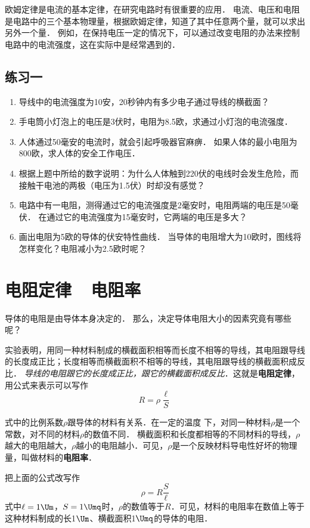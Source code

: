 欧姆定律是电流的基本定律，在研究电路时有很重要的应用．
电流、电压和电阻是电路中的三个基本物理量，根据欧姆定律，知道了其中任意两个量，就可以求出另外一个量．
例如，在保持电压一定的情况下，可以通过改变电阻的办法来控制电路中的电流强度，这在实际中是经常遇到的．


\subsection*{练习一}

\begin{enumerate}
    \item 导线中的电流强度为10安，20秒钟内有多少电子通过导线的横截面？
    \item 手电筒小灯泡上的电压是3伏时，电阻为8.5欧，求通过小灯泡的电流强度．
    \item 人体通过50毫安的电流时，就会引起呼吸器官麻痹．
    如果人体的最小电阻为800欧，求人体的安全工作电压．
    \item 根据上题中所给的数字说明：为什么人体触到220伏的电线时会发生危险，而接触干电池的两极（电压为1.5伏）时却没有感觉？
    \item 电路中有一电阻，测得通过它的电流强度是2毫安时，电阻两端的电压是50毫伏．
    在通过它的电流强度为15毫安时，它两端的电压是多大？
    \item 画出电阻为5欧的导体的伏安特性曲线．
    当导体的电阻增大为10欧时，图线将怎样变化？电阻减小为2.5欧时呢？
\end{enumerate}


\section{电阻定律~~电阻率}
导体的电阻是由导体本身决定的．
那么，决定导体电阻大小的因素究竟有哪些呢？

实验表明，用同一种材料制成的横截面积相等而长度不相等的导线，其电阻跟导线的长度成正比；长度相等而横截面积不相等的导线，其电阻跟导线的横截面积成反比．
\textit{导线的电阻跟它的长度成正比，跟它的横截面积成反比}．这就是\textbf{电阻定律}，用公式来表示可以写作
\[R=\rho\frac{\ell}{S}\]

式中的比例系数$\rho$跟导体的材料有关系．在一定的温度
下，对同一种材料$\rho$是一个常数，对不同的材料$\rho$的数值不同．
横截面积和长度都相等的不同材料的导线，$\rho$越大的电阻越大，$\rho$越小的电阻越小．可见，$\rho$是一个反映材料导电性好坏的物理量，叫做材料的\textbf{电阻率}．

把上面的公式改写作
\[\rho=R\frac{S}{\ell}\]
式中$\ell=1 \Um$，$S=1\Umq$时，$\rho$的数值等于$R$．可见，材料的电阻率在数值上等于这种材料制成的长1$\Um$、横截面积1$\Umq$的导体的电阻．

